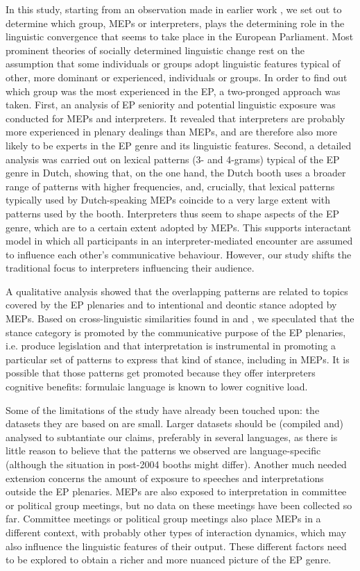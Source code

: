 \documentclass[output=paper]{langscibook}
\begin{document}
In this study, starting from an observation made in earlier work \citep{Defrancq2018}, we set out to determine which group, MEPs or interpreters, plays the determining role in the linguistic convergence that seems to take place in the European Parliament. Most prominent theories of socially determined linguistic change rest on the assumption that some individuals or groups adopt linguistic features typical of other, more dominant or experienced, individuals or groups. In order to find out which group was the most experienced in the EP, a two-pronged approach was taken. First, an analysis of EP seniority and potential linguistic exposure was conducted for MEPs and interpreters. It revealed that interpreters are probably more experienced in plenary dealings than MEPs, and are therefore also more likely to be experts in the EP genre and its linguistic features. Second, a detailed analysis was carried out on lexical patterns (3- and 4-grams) typical of the EP genre in Dutch, showing that, on the one hand, the Dutch booth uses a broader range of patterns with higher frequencies, and, crucially, that lexical patterns typically used by Dutch-speaking MEPs coincide to a very large extent with patterns used by the booth. Interpreters thus seem to shape aspects of the EP genre, which are to a certain extent adopted by MEPs. This supports  interactant model in which all participants in an interpreter-mediated encounter are assumed to influence each other’s communicative behaviour. However, our study shifts the traditional focus to interpreters influencing their audience.

A qualitative analysis showed that the overlapping patterns are related to topics covered by the EP plenaries and to intentional and deontic stance adopted by MEPs. Based on cross-linguistic similarities found in \citet{granger_lexical_2014} and \citet{Aston2018}, we speculated that the stance category is promoted by the communicative purpose of the EP plenaries, i.e. produce legislation and that interpretation is instrumental in promoting a particular set of patterns to express that kind of stance, including in MEPs. It is possible that those patterns get promoted because they offer interpreters cognitive benefits: formulaic language is known to lower cognitive load. 

Some of the limitations of the study have already been touched upon: the datasets they are based on are small. Larger datasets should be (compiled and) analysed to subtantiate our claims, preferably in several languages, as there is little reason to believe that the patterns we observed are language-specific (although the situation in post-2004 booths might differ). Another much needed extension concerns the amount of exposure to speeches and interpretations outside the EP plenaries. MEPs are also exposed to interpretation in committee or political group meetings, but no data on these meetings have been collected so far. Committee meetings or political group meetings also place MEPs in a different context, with probably other types of interaction dynamics, which may also influence the linguistic features of their output. These different factors need to be explored to obtain a richer and more nuanced picture of the EP genre.
\end{document}
